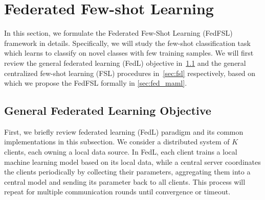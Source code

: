\section{Federated Few-shot Learning}
\label{sec:approach}

In this section, we formulate the Federated Few-Shot Learning (FedFSL) framework in details. Specifically, we will study the few-shot classification task which learns to classify on novel classes with few training samples.
We will first review the general federated learning (FedL) objective in~\ref{sec:fl} and the general centralized few-shot learning (FSL) procedures in~\ref{sec:fsl} respectively, based on which we propose the FedFSL formally in
\ref{sec:fed_maml}.

 
\subsection{General Federated Learning Objective}
\label{sec:fl}
First, we briefly review federated learning (FedL) paradigm and its common implementations in this subsection. 
We consider a distributed system of $K$ clients, each owning a local data source. In FedL, each client trains a local machine learning model based on its local data, while a central server coordinates the clients periodically by collecting their parameters, aggregating them into a central model and sending its parameter back to all clients.
This process will repeat for multiple communication rounds until convergence or timeout.  

